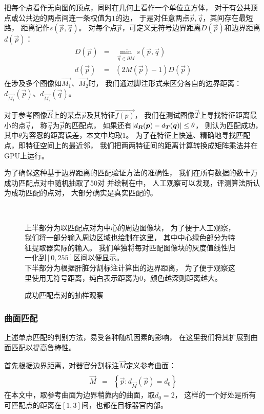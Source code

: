 把每个点看作无向图的顶点，同时在几何上看作一个单位立方体，
对于有公共顶点或公共边的两点间连一条权值为$1$的边，
于是对任意两点$\vec{p}, \vec{q}$，其间存在最短路，
距离记作$s(\vec{p}, \vec{q})$。
对每个点$\vec{p}$，可定义无符号边界距离$D(\vec{p})$和边界距离$d(\vec{p})$：
\begin{eqnarray}
    D(\vec{p}) &=& \min_{\vec{q} \in \partial M} s(\vec{p}, \vec{q})
        \nonumber \\
    d(\vec{p}) &=& (2M(\vec{p})-1)D(\vec{p})
\end{eqnarray}
在涉及多个图像如$\vec{M_1}$、$\vec{M_2}$时，
我们通过脚注形式来区分各自的边界距离：
$d_{\vec{M_1}}(\vec{p})$、$d_{\vec{M_2}}(\vec{q})$。

对于参考图像$\vec{R}$上的某点$\vec{p}$及其特征$\vec{f(p)}$，
我们在测试图像$\vec{T}$上寻找特征距离最小的点$\vec{q}$，
称$\vec{q}$为$\vec{p}$的匹配点，
如果还有$\left|d_{\boldsymbol{R}}(\boldsymbol{p}) - d_{\boldsymbol{T}}(\boldsymbol{q})\right| \le \theta$，
则认为匹配成功，其中$\theta$为容忍的距离误差，本文中均取$1$。
为了在特征上快速、精确地寻找匹配点，即特征空间上的最近邻，
我们把两两特征间的距离计算转换成矩阵乘法并在GPU上运行。

为了确保这种基于边界距离的匹配验证方法的准确性，
我们在所有数据的数十万成功匹配点对中随机抽取了50对
并绘制在中，
人工观察可以发现，评测算法所认为成功匹配的点对，
大部分确实是真实匹配的。
\begin{figure}[h!]
    {
         \\
        \vspace{0.2em}
        \caption{成功匹配点对的抽样观察}
        \label{fig:expr:pt:match}
    }
    \footnotesize
    上半部分为以匹配点对为中心的周边图像块，
    为了便于人工观察，我们将一部分输入周边区域也绘制在这里，
    其中中心绿色部分为特征提取器实际的输入。
    我们单独将每对匹配图像块的灰度值线性归一化到$[0, 255]$区间以便显示。 \\
    下半部分为根据肝脏分割标注计算出的边界距离，
    为了便于观察这里使用无符号距离，纯白表示距离为$0$，颜色越深则距离越大。
\end{figure}

\subsubsection{曲面匹配\label{sec:expr:match}}
上述单点匹配的判别方法，易受各种随机因素的影响，
在这里我们将其扩展到曲面匹配以提高鲁棒性。

首先根据边界距离，对器官分割标注$\vec{M}$定义参考曲面：
\begin{eqnarray}
    \hat{\vec{M}} &=& \left\{ \vec{p} : d_{\vec{M}}(\vec{p}) = d_0 \right\}
\end{eqnarray}
在本文中，取参考曲面为边界稍靠内的曲面，取$d_0=2$，
这样的一个好处是所有可匹配点的距离在$[1, 3]$间，也都在目标器官内部。

